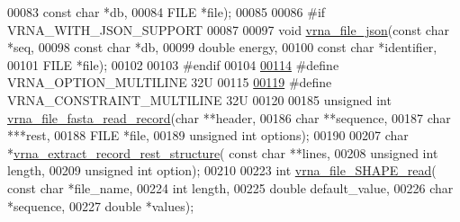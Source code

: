 \begin{DoxyCode}
00083                       \textcolor{keyword}{const} \textcolor{keywordtype}{char} *db,
00084                       FILE *file);
00085 
00086 \textcolor{preprocessor}{#if VRNA\_WITH\_JSON\_SUPPORT}
00087 
00097 \textcolor{keywordtype}{void} \hyperlink{group__file__utils_ga31f4a6c2ea1495a6e4f9eb45a9f6193d}{vrna\_file\_json}(\textcolor{keyword}{const} \textcolor{keywordtype}{char} *seq,
00098                     \textcolor{keyword}{const} \textcolor{keywordtype}{char} *db,
00099                     \textcolor{keywordtype}{double} energy,
00100                     \textcolor{keyword}{const} \textcolor{keywordtype}{char} *identifier,
00101                     FILE *file);
00102 
00103 \textcolor{preprocessor}{#endif}
00104 
\hyperlink{group__file__utils_gabec89c09874528c6cb73140a4c3d86d7}{00114} \textcolor{preprocessor}{#define VRNA\_OPTION\_MULTILINE             32U}
00115 
\hyperlink{group__file__utils_ga7d725ef525b29891abef3f1ed42599a4}{00119} \textcolor{preprocessor}{#define VRNA\_CONSTRAINT\_MULTILINE         32U}
00120 
00185 \textcolor{keywordtype}{unsigned} \textcolor{keywordtype}{int} \hyperlink{group__file__utils_ga8cfb7e271efc9e1f34640acb85475639}{vrna\_file\_fasta\_read\_record}(\textcolor{keywordtype}{char} **header,
00186                                     \textcolor{keywordtype}{char} **sequence,
00187                                     \textcolor{keywordtype}{char}  ***rest,
00188                                     FILE *file,
00189                                     \textcolor{keywordtype}{unsigned} \textcolor{keywordtype}{int} options);
00190 
00207 \textcolor{keywordtype}{char} *\hyperlink{group__file__utils_gad37cbb63a05eed63ba25c91628409be0}{vrna\_extract\_record\_rest\_structure}( \textcolor{keyword}{const} \textcolor{keywordtype}{char} **lines,
00208                                           \textcolor{keywordtype}{unsigned} \textcolor{keywordtype}{int} length,
00209                                           \textcolor{keywordtype}{unsigned} \textcolor{keywordtype}{int} option);
00210 
00223 \textcolor{keywordtype}{int} \hyperlink{group__file__utils_ga646ebf45450a69a7f2533f9ecd283a32}{vrna\_file\_SHAPE\_read}( \textcolor{keyword}{const} \textcolor{keywordtype}{char} *file\_name,
00224                           \textcolor{keywordtype}{int} length,
00225                           \textcolor{keywordtype}{double} default\_value,
00226                           \textcolor{keywordtype}{char} *sequence,
00227                           \textcolor{keywordtype}{double} *values);

\end{DoxyCode}
